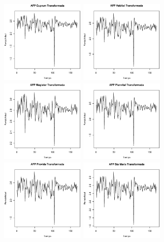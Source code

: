 \begin{figure}[!ht]
\begin{center}
\centering
  \includegraphics[height=4cm, width=4cm]{afptr1.eps}
  \includegraphics[height=4cm, width=4cm]{afptr2.eps}
  \includegraphics[height=4cm, width=4cm]{afptr3.eps}
  \includegraphics[height=4cm, width=4cm]{afptr4.eps}\\
  \includegraphics[height=4cm, width=4cm]{afptr5.eps}
  \includegraphics[height=4cm, width=4cm]{afptr6.eps}

\end{center}
\end{figure}
